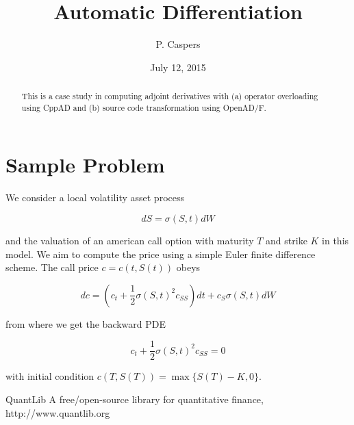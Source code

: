 \documentclass{amsart}
\theoremstyle{plain}
\numberwithin{equation}{section}
\begin{document}
\title[AD]{Automatic Differentiation}
\author{P. Caspers}
\date{July 12, 2015}
\begin{abstract}
This is a case study in computing adjoint derivatives with (a) operator overloading using CppAD and (b) source code transformation using OpenAD/F.
\end{abstract}

\maketitle

\tableofcontents

\section{Sample Problem}

We consider a local volatility asset process 

\begin{equation}
dS = \sigma(S,t) dW
\end{equation}

and the valuation of an american call option with maturity $T$ and strike $K$ in this model. We aim to compute the price using a simple Euler finite difference scheme. The call price $c = c(t,S(t))$ obeys

\begin{equation}
dc = \left(c_t + \frac{1}{2} \sigma(S,t)^2 c_{SS}\right) dt + c_S \sigma(S,t) dW 
\end{equation}

from where we get the backward PDE

\begin{equation}
c_t + \frac{1}{2}\sigma(S,t)^2c_{SS} = 0
\end{equation}

with initial condition $c(T,S(T)) = \max\{ S(T) - K, 0 \}$.





\begin{thebibliography}{2}

QuantLib A free/open-source library for quantitative finance, http://www.quantlib.org

\end{thebibliography}
\end{document}
